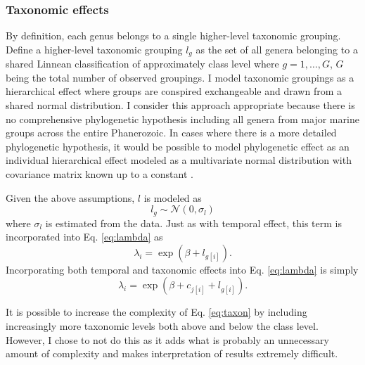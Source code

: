 \documentclass[12pt,letterpaper]{article}
\begin{document}
\subsubsection{Taxonomic effects}

By definition, each genus belongs to a single higher-level taxonomic grouping. Define a higher-level taxonomic grouping \(l_{g}\) as the set of all genera belonging to a shared Linnean classification of approximately class level where \(g = 1, \dots, G\), \(G\) being the total number of observed groupings. I model taxonomic groupings as a hierarchical effect where groups are conspired exchangeable and drawn from a shared normal distribution. I consider this approach appropriate because there is no comprehensive phylogenetic hypothesis including all genera from major marine groups across the entire Phanerozoic. In cases where there is a more detailed phylogenetic hypothesis, it would be possible to model phylogenetic effect as an individual hierarchical effect modeled as a multivariate normal distribution with covariance matrix known up to a constant \citep{Lynch1991,Housworth2004}.

Given the above assumptions, \(l\) is modeled as
\begin{equation}
  l_{g} \sim \mathcal{N}(0, \sigma_{l})
  \label{eq:taxon}
\end{equation}
where \(\sigma_{l}\) is estimated from the data. Just as with temporal effect, this term is incorporated into Eq. \ref{eq:lambda} as
\begin{equation}
  \lambda_{i} = \exp(\beta + l_{g[i]}).
  \label{eq:lambda_taxon}
\end{equation}
Incorporating both temporal and taxonomic effects into Eq. \ref{eq:lambda} is simply
\begin{equation}
  \lambda_{i} = \exp(\beta + c_{j[i]} + l_{g[i]}).
  \label{eq:lambda_full}
\end{equation}

It is possible to increase the complexity of Eq. \ref{eq:taxon} by including increasingly more taxonomic levels both above and below the class level. However, I chose to not do this as it adds what is probably an unnecessary amount of complexity and makes interpretation of results extremely difficult.
\end{document}
